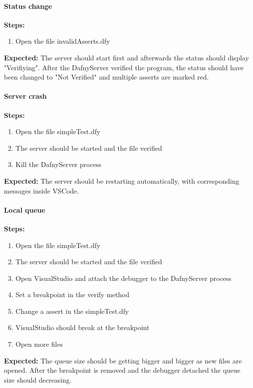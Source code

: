 \paragraph{Status change}
\textbf{\newline Steps:}
\begin{enumerate}
	\item Open the file invalidAsserts.dfy

\end{enumerate}
\textbf{\newline Expected:}
The server should start first and afterwards the status should display "Verifiying". After the DafnyServer verified the program, the status should have been changed to "Not Verified" and multiple asserts are marked red. 

\paragraph{Server crash}
\textbf{\newline Steps:}
\begin{enumerate}
	\item Open the file simpleTest.dfy
	\item The server should be started and the file verified
	\item Kill the DafnyServer process
\end{enumerate}
\textbf{\newline Expected:}
The server should be restarting automatically, with corresponding messages inside VSCode. 


\paragraph{Local queue}
\textbf{\newline Steps:}
\begin{enumerate}
	\item Open the file simpleTest.dfy
	\item The server should be started and the file verified
	\item Open VisualStudio and attach the debugger to the DafnyServer process
	\item Set a breakpoint in the verify method
	\item Change a assert in the simpleTest.dfy 
	\item VisualStudio should break at the breakpoint
	\item Open more files
\end{enumerate}
\textbf{\newline Expected:}
The queue size should be getting bigger and bigger as new files are opened. After the breakpoint is removed and the debugger detached the queue size should decreasing. 

